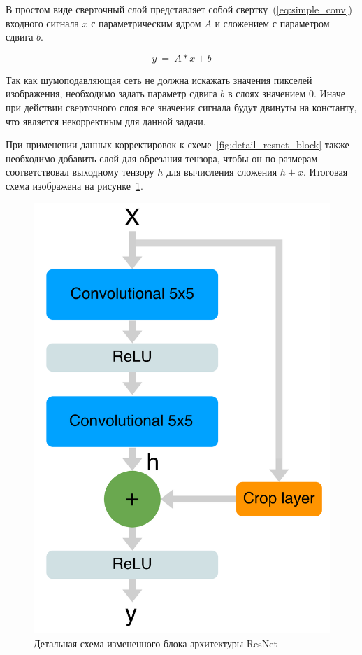 \documentclass[14pt]{mmcs_article}
\begin{document}
В простом виде сверточный слой представляет собой свертку~(\ref{eq:simple_conv})  входного сигнала $x$ с параметрическим ядром $A$ и сложением с параметром сдвига $b$.

\begin{equation}\label{eq:simple_conv}
y\ =\ A \ast x + b
\end{equation}

Так как шумоподавляющая сеть не должна искажать значения пикселей изображения, необходимо задать параметр сдвига $b$ в слоях значением $0$. Иначе при действии сверточного слоя все значения сигнала будут двинуты на константу, что является некорректным для данной задачи.

При применении данных корректировок к схеме~\ref{fig:detail_resnet_block} также необходимо добавить слой для обрезания тензора, чтобы он по размерам соответствовал выходному тензору $h$ для вычисления сложения $h + x$. Итоговая схема изображена на рисунке~\ref{fig:detail_adjuster_resnet_block}.


\begin{figure}[H]
	\centering
	\includegraphics[scale=0.15]{img/resnet_adjusted}
	\caption{Детальная схема измененного блока архитектуры ResNet} 
	\label{fig:detail_adjuster_resnet_block}
\end{figure}
\end{document}
